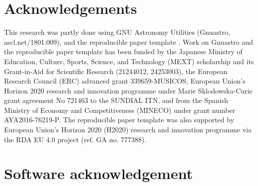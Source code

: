 \documentclass[10pt, twocolumn]{article}
\begin{document}
\section{Acknowledgements}

This research was partly done using GNU Astronomy Utilities (Gnuastro,
ascl.net/1801.009), and the reproducible paper template
\projectversion. Work on Gnuastro and the reproducible paper template has
been funded by the Japanese Ministry of Education, Culture, Sports,
Science, and Technology (MEXT) scholarship and its Grant-in-Aid for
Scientific Research (21244012, 24253003), the European Research Council
(ERC) advanced grant 339659-MUSICOS, European Union’s Horizon 2020 research
and innovation programme under Marie Sklodowska-Curie grant agreement No
721463 to the SUNDIAL ITN, and from the Spanish Ministry of Economy and
Competitiveness (MINECO) under grant number AYA2016-76219-P.  The
reproducible paper template was also supported by European Union’s Horizon
2020 (H2020) research and innovation programme via the RDA EU 4.0 project
(ref. GA no. 777388).

\printbibliography

\appendix

\section{Software acknowledgement}


\end{document}
